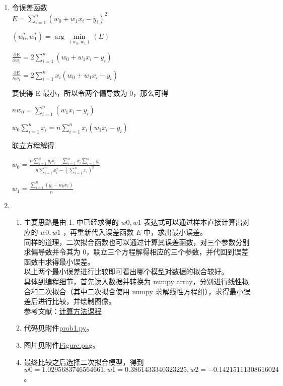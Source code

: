 \documentclass[11pt,letter,notitlepage]{article}
\begin{document}
\begin{solution}
	\heiti
	\ \\
	\begin{enumerate}
		\item 令误差函数\\$E = \sum\limits_{i=1}^n(w_0 + w_1x_i -y_i)^2$
	
		$(w_0^*,w_1^*) = \arg\min\limits_{(w_0,w_1)}(E)$
	
		$\frac{\partial E}{\partial w_0} = 2\sum\limits_{i=1}^n(w_0 + w_1x_i - y_i)$
	
		$\frac{\partial E}{\partial w_1} = 2\sum\limits_{i=1}^nx_i(w_0 + w_1x_i - y_i)$
	
		要使得 E 最小，所以令两个偏导数为 0，那么可得
	
		$nw_0 = \sum\limits_{i=1}^n(w_1x_i-y_i) $
	
		$w_0\sum\limits_{i=1}^nx_i = n\sum\limits_{i=1}^nx_i(w_1x_i-y_i)$
		
		联立方程解得
	
		$ w_0 = \frac{n\sum\limits_{i=1}^ny_ix_i - \sum\limits_{i=1}^nx_i\sum\limits_{i=1}^ny_i}{n\sum\limits_{i=1}^nx_i^2-(\sum\limits_{i=1}^nx_i)^2}$
	
		$ w_1 = \frac{\sum\limits_{i=1}^n(y_i-w_0x_i)}{n}$ 
		\item \ 
			\begin{enumerate}
				\item 主要思路是由 1. 中已经求得的 $w0,w1$ 表达式可以通过样本直接计算出对应的 $w0,w1$ ，再重新代入误差函数 $E$ 中，求出最小误差。\\
				同样的道理，二次拟合函数也可以通过计算其误差函数，对三个参数分别求偏导数并令其为 0，联立三个方程解得相应的三个参数，并代回到误差函数中求得最小误差。\\
				以上两个最小误差进行比较即可看出哪个模型对数据的拟合较好。\\
				具体到编程细节，首先读入数据并转换为 numpy array，分别进行线性拟合和二次拟合（其中二次拟合使用 numpy 求解线性方程组），求得最小误差后进行比较，并绘制图像。\\
				参考文献：\href{https://www.bb.ustc.edu.cn/jpkc/xiaoji/szjsff/jsffkj/chapt3_2.htm}{计算方法课程} 
				\item 代码见附件\href{./prob1.py}{prob1.py}。
				\item 图片见附件\href{./Figure.png}{Figure.png}。
				\item 最终比较之后选择二次拟合模型，得到 $w0 = 1.0295683746564661, w1 = 0.3861433340323225, w2 = -0.14215111308616024$。
			\end{enumerate}
	\end{enumerate}
\end{solution}
\end{document}

